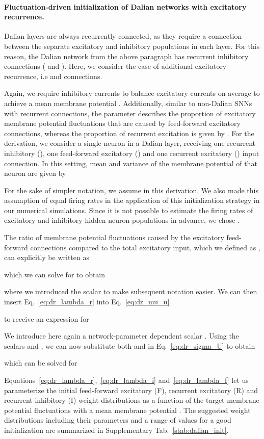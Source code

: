 \documentclass[11pt,a4paper]{article}
\begin{document}
 
\paragraph{Fluctuation-driven initialization of Dalian networks with excitatory recurrence.}
Dalian layers are always recurrently connected, as they require a connection between the separate excitatory and inhibitory populations in each layer. For this reason, the Dalian network from the above paragraph has recurrent inhibitory connections ( and ). Here, we consider the case of additional excitatory recurrence, i.e  and  connections. 

Again, we require inhibitory currents to balance excitatory currents on average to achieve a mean membrane potential . 
Additionally, similar to non-Dalian \acp{SNN} with recurrent connections, the parameter  describes the proportion of excitatory membrane potential fluctuations that are caused by feed-forward excitatory connections, whereas the proportion of recurrent excitation is given by .
For the derivation, we consider a single neuron in a Dalian layer, receiving one recurrent inhibitory (), one feed-forward excitatory () and one recurrent excitatory () input connection. In this setting, mean  and variance  of the membrane potential of that neuron are given by


For the sake of simpler notation, we assume  in this derivation. 
We also made this assumption of equal firing rates in the application of this initialization strategy in our numerical simulations. Since it is not possible to estimate the firing rates of excitatory and inhibitory hidden neuron populations in advance, we chose .

The ratio of membrane potential fluctuations caused by the excitatory feed-forward connections compared to the total excitatory input, which we defined as , can explicitly be written as

which we can solve for  to obtain

where we introduced the scalar  to make subsequent notation easier. We can then insert Eq.~\eqref{eq:dr_lambda_r} into Eq.~\eqref{eq:dr_mu_u}

to receive an expression for 


We introduce here again a network-parameter dependent scalar . Using the scalars   and , we can now substitute both  and  in Eq.~\eqref{eq:dr_sigma_U} to obtain


which can be solved for 


Equations~\eqref{eq:dr_lambda_r},~\eqref{eq:dr_lambda_i} and~\eqref{eq:dr_lambda_f} let us parameterize the initial feed-forward excitatory (F), recurrent excitatory (R) and recurrent inhibitory (I) weight distributions as a function of the target membrane potential fluctuations  with a mean membrane potential . The suggested weight distributions including their parameters and a range of values for a good initialization are summarized in Supplementary Tab.~\ref{stab:dalian_init}. 
\end{document}
